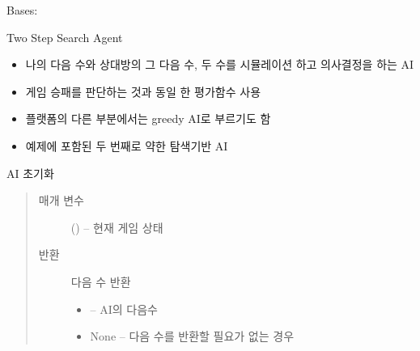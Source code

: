 \documentclass[letterpaper,10pt,english]{sphinxmanual}
\begin{document}
\begin{fulllineitems}
\label{\detokenize{agents.search:agents.search.two_step_search_agent.TwoStepSearchAgent}}
Bases: {\hyperref[\detokenize{agents:agents.BaseAgent}]{}}

Two Step Search Agent
\begin{itemize}
\item {} 
나의 다음 수와 상대방의 그 다음 수, 두 수를 시뮬레이션 하고 의사결정을 하는 AI

\item {} 
게임 승패를 판단하는 것과 동일 한 평가함수 사용

\item {} 
플랫폼의 다른 부분에서는 greedy AI로 부르기도 함

\item {} 
예제에 포함된 두 번째로 약한 탐색기반 AI

\end{itemize}

\begin{fulllineitems}
\label{\detokenize{agents.search:agents.search.two_step_search_agent.TwoStepSearchAgent.act}}
AI 초기화
\begin{quote}\begin{description}
\item[{매개 변수}] \leavevmode
{} ({\hyperref[\detokenize{scripts:scripts.run_game.State}]{}}) -- 현재 게임 상태

\item[{반환}] \leavevmode

다음 수 반환
\begin{itemize}
\item {} 
 -- AI의 다음수

\item {} 
None -- 다음 수를 반환할 필요가 없는 경우

\end{itemize}


\end{description}\end{quote}


\end{fulllineitems}
\end{fulllineitems}
\end{document}
